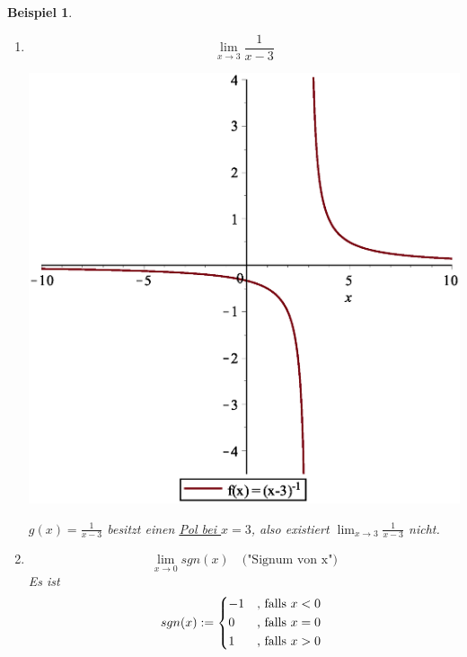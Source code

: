 \documentclass{report}
\newtheorem{myexample}{Beispiel}
\begin{document}
\begin{myexample}
\begin{enumerate}
\item \begin{equation}\lim_{x \to 3} \frac{1}{x-3}\end{equation}
\begin{center}\includegraphics[scale=0.2]{images/limes_x-3.eps}\end{center}
$g(x) = \frac{1}{x-3}$ besitzt einen \underline{Pol bei $x = 3$}, also existiert $\lim_{x \to 3} \frac{1}{x-3}$ nicht.
\item \begin{equation}\lim_{x \to 0} sgn(x) \quad \mbox{("Signum von x")}\end{equation}Es ist
\[
 sgn(x) := \begin{dcases*}
        -1  &, falls $x < 0$\\
        0 &, falls $x = 0$\\
	1 & , falls $x > 0$
        \end{dcases*}
\]

\end{enumerate}
\end{myexample}
\end{document}

